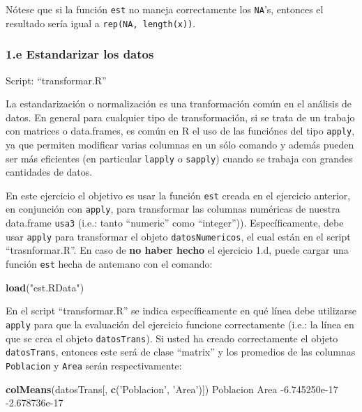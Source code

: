 \documentclass[]{article}
\newenvironment{Shaded}{}{}
\newcommand{\KeywordTok}[1]{\textcolor[rgb]{0.00,0.44,0.13}{\textbf{{#1}}}}
\newcommand{\FloatTok}[1]{\textcolor[rgb]{0.25,0.63,0.44}{{#1}}}
\newcommand{\StringTok}[1]{\textcolor[rgb]{0.25,0.44,0.63}{{#1}}}
\newcommand{\NormalTok}[1]{{#1}}
\begin{document}
Nótese que si la función \texttt{est} no maneja correctamente los
\texttt{NA}'s, entonces el resultado sería igual a
\texttt{rep(NA, length(x))}.

\subsubsection{1.e Estandarizar los datos}

Script: ``transformar.R''

La estandarización o normalización es una tranformación común en el
análisis de datos. En general para cualquier tipo de transformación, si
se trata de un trabajo con matrices o data.frames, es común en R el uso
de las funciónes del tipo \texttt{apply}, ya que permiten modificar
varias columnas en un sólo comando y además pueden ser más eficientes
(en particular \texttt{lapply} o \texttt{sapply}) cuando se trabaja con
grandes cantidades de datos.

En este ejercicio el objetivo es usar la función \texttt{est} creada en
el ejercicio anterior, en conjunción con \texttt{apply}, para
transformar las columnas numéricas de nuestra data.frame \texttt{usa3}
(i.e.: tanto ``numeric'' como ``integer'')). Específicamente, debe usar
\texttt{apply} para transformar el objeto \texttt{datosNumericos}, el
cual están en el script ``trasnformar.R''. En caso de \textbf{no haber
hecho} el ejercicio 1.d, puede cargar una función \texttt{est} hecha de
antemano con el comando:

\begin{Shaded}
\begin{Highlighting}[]
\KeywordTok{load}\NormalTok{(}\StringTok{"est.RData"}\NormalTok{)}
\end{Highlighting}
\end{Shaded}

En el script ``transformar.R'' se indica específicamente en qué línea
debe utilizarse \texttt{apply} para que la evaluación del ejercicio
funcione correctamente (i.e.: la línea en que se crea el objeto
\texttt{datosTrans}). Si usted ha creado correctamente el objeto
\texttt{datosTrans}, entonces este será de clase ``matrix'' y los
promedios de las columnas \texttt{Poblacion} y \texttt{Area} serán
respectivamente:

\begin{Shaded}
\begin{Highlighting}[]
\KeywordTok{colMeans}\NormalTok{(datosTrans[, }\KeywordTok{c}\NormalTok{(}\StringTok{'Poblacion'}\NormalTok{, }\StringTok{'Area'}\NormalTok{)])}
    \NormalTok{Poblacion          Area }
\NormalTok{-}\FloatTok{6.745250e-17} \NormalTok{-}\FloatTok{2.678736e-17}
\end{Highlighting}
\end{Shaded}
\end{document}
